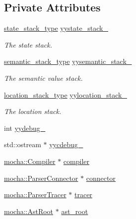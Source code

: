 \subsection*{Private Attributes}
\begin{DoxyCompactItemize}
\item 
\hyperlink{classyy_1_1stack}{state\_\-stack\_\-type} \hyperlink{classyy_1_1_parser_implementation_a6d0d1eecdcab5bd454bfe5484c026849}{yystate\_\-stack\_\-}
\begin{DoxyCompactList}\small\item\em The state stack. \end{DoxyCompactList}\item 
\hyperlink{classyy_1_1stack}{semantic\_\-stack\_\-type} \hyperlink{classyy_1_1_parser_implementation_a5b73cdc486e32cb025ab0e4423d65f99}{yysemantic\_\-stack\_\-}
\begin{DoxyCompactList}\small\item\em The semantic value stack. \end{DoxyCompactList}\item 
\hyperlink{classyy_1_1stack}{location\_\-stack\_\-type} \hyperlink{classyy_1_1_parser_implementation_a43f9699961e4179bc5acaeeb52942502}{yylocation\_\-stack\_\-}
\begin{DoxyCompactList}\small\item\em The location stack. \end{DoxyCompactList}\item 
int \hyperlink{classyy_1_1_parser_implementation_a425e4a850d551cc72a476db0af50b7af}{yydebug\_\-}
\item 
std::ostream $\ast$ \hyperlink{classyy_1_1_parser_implementation_a2e23f250bc33f4a75dbc1acec6966a5b}{yycdebug\_\-}
\item 
\hyperlink{classmocha_1_1_compiler}{mocha::Compiler} $\ast$ \hyperlink{classyy_1_1_parser_implementation_acff46cf1c175e18ce89b6f4f4f3d8c1e}{compiler}
\item 
\hyperlink{classmocha_1_1_parser_connector}{mocha::ParserConnector} $\ast$ \hyperlink{classyy_1_1_parser_implementation_a678bb517350badcd5d5f5e1aa7c9aa46}{connector}
\item 
\hyperlink{classmocha_1_1_parser_tracer}{mocha::ParserTracer} $\ast$ \hyperlink{classyy_1_1_parser_implementation_a829e14b2eb8ba321cd237e6f3316a0e9}{tracer}
\item 
\hyperlink{classmocha_1_1_ast_root}{mocha::AstRoot} $\ast$ \hyperlink{classyy_1_1_parser_implementation_a6ebc819f18b4e56092d059d07981f929}{ast\_\-root}
\end{DoxyCompactItemize}
